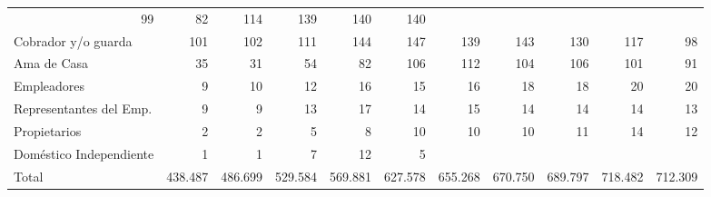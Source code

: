 \begin{tabular}{lllllllllll}
  \multicolumn{1}{r}{99} &
  \multicolumn{1}{r}{82} &
  \multicolumn{1}{r}{114} &
  \multicolumn{1}{r}{139} &
  \multicolumn{1}{r}{140} &
  \multicolumn{1}{r}{140} \\
\multicolumn{1}{l}{\hspace{1em}Cobrador y/o guarda} &
  \multicolumn{1}{|r}{101} &
  \multicolumn{1}{r}{102} &
  \multicolumn{1}{r}{111} &
  \multicolumn{1}{r}{144} &
  \multicolumn{1}{r}{147} &
  \multicolumn{1}{r}{139} &
  \multicolumn{1}{r}{143} &
  \multicolumn{1}{r}{130} &
  \multicolumn{1}{r}{117} &
  \multicolumn{1}{r}{98} \\
\multicolumn{1}{l}{\hspace{1em}Ama de Casa} &
  \multicolumn{1}{|r}{35} &
  \multicolumn{1}{r}{31} &
  \multicolumn{1}{r}{54} &
  \multicolumn{1}{r}{82} &
  \multicolumn{1}{r}{106} &
  \multicolumn{1}{r}{112} &
  \multicolumn{1}{r}{104} &
  \multicolumn{1}{r}{106} &
  \multicolumn{1}{r}{101} &
  \multicolumn{1}{r}{91} \\
\multicolumn{1}{l}{\hspace{1em}Empleadores} &
  \multicolumn{1}{|r}{9} &
  \multicolumn{1}{r}{10} &
  \multicolumn{1}{r}{12} &
  \multicolumn{1}{r}{16} &
  \multicolumn{1}{r}{15} &
  \multicolumn{1}{r}{16} &
  \multicolumn{1}{r}{18} &
  \multicolumn{1}{r}{18} &
  \multicolumn{1}{r}{20} &
  \multicolumn{1}{r}{20} \\
\multicolumn{1}{l}{\hspace{1em}Representantes del Emp.} &
  \multicolumn{1}{|r}{9} &
  \multicolumn{1}{r}{9} &
  \multicolumn{1}{r}{13} &
  \multicolumn{1}{r}{17} &
  \multicolumn{1}{r}{14} &
  \multicolumn{1}{r}{15} &
  \multicolumn{1}{r}{14} &
  \multicolumn{1}{r}{14} &
  \multicolumn{1}{r}{14} &
  \multicolumn{1}{r}{13} \\
\multicolumn{1}{l}{\hspace{1em}Propietarios} &
  \multicolumn{1}{|r}{2} &
  \multicolumn{1}{r}{2} &
  \multicolumn{1}{r}{5} &
  \multicolumn{1}{r}{8} &
  \multicolumn{1}{r}{10} &
  \multicolumn{1}{r}{10} &
  \multicolumn{1}{r}{10} &
  \multicolumn{1}{r}{11} &
  \multicolumn{1}{r}{14} &
  \multicolumn{1}{r}{12} \\
\multicolumn{1}{l}{\hspace{1em}Doméstico Independiente} &
  \multicolumn{1}{|r}{1} &
  \multicolumn{1}{r}{1} &
  \multicolumn{1}{r}{7} &
  \multicolumn{1}{r}{12} &
  \multicolumn{1}{r}{5} &
  \multicolumn{1}{r}{} &
  \multicolumn{1}{r}{} &
  \multicolumn{1}{r}{} &
  \multicolumn{1}{r}{} &
  \multicolumn{1}{r}{} \\
\multicolumn{1}{l}{\hspace{1em}Total} &
  \multicolumn{1}{|r}{438.487} &
  \multicolumn{1}{r}{486.699} &
  \multicolumn{1}{r}{529.584} &
  \multicolumn{1}{r}{569.881} &
  \multicolumn{1}{r}{627.578} &
  \multicolumn{1}{r}{655.268} &
  \multicolumn{1}{r}{670.750} &
  \multicolumn{1}{r}{689.797} &
  \multicolumn{1}{r}{718.482} &
  \multicolumn{1}{r}{712.309} \\
\cline{1-11}
\end{tabular}
